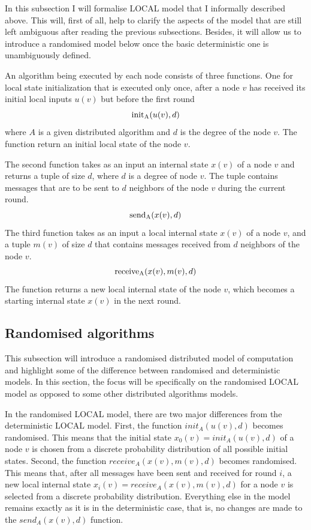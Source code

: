 In this subsection I will formalise LOCAL model that I informally described above.
This will, first of all, help to clarify the aspects of the model that are still left ambiguous
after reading the previous subsections. Besides, it will allow us to introduce
a randomised model below once the basic deterministic one is unambiguously defined.

An algorithm being executed by each node consists of 
three functions. One for local state initialization that is executed only once, after
a node $v$ has received its initial local inputs $u(v)$ but before the first round
$$\init_A(u(v), d)$$
where $A$ is a given distributed algorithm and $d$ is the degree of the node $v$.
The function return an initial local state of the node $v$.

The second function takes as an input an internal state $x(v)$ of a node $v$
and returns a tuple of size $d$, where $d$ is a degree of node $v$. The
tuple contains messages that are to be sent to $d$ neighbors of the node $v$
during the current round.
$$\send_A(x(v), d)$$
The third function takes as an input a local internal state $x(v)$ of a node
$v$, and a tuple $m(v)$ of size $d$ that contains messages received from $d$ neighbors
of the node $v$.
$$\receive_A(x(v), m(v), d)$$
The function returns a new local internal state of the node $v$, which becomes a
starting internal state $x(v)$ in the next round.

\subsection{Randomised algorithms}

This subsection will introduce a randomised distributed model of computation
and highlight some of the difference between randomised and deterministic
models. In this section, the focus will be specifically on the randomised LOCAL
model as opposed to some other distributed algorithms models.

In the randomised LOCAL model, there are two major differences from the
deterministic LOCAL model. First, the function $init_A(u(v), d)$ becomes
randomised. This means that the initial state $x_0(v) = init_A(u(v), d)$ of a node $v$ is
chosen from a discrete probability distribution of all possible initial states.
Second, the function $receive_A(x(v), m(v), d)$ becomes randomised. This means that,
after all messages have been sent and received for round $i$, a new local internal
state $x_i(v) = receive_A(x(v), m(v), d)$ for a node $v$ is selected from a
discrete probability distribution. Everything else in the model remains exactly
as it is in the deterministic case, that is, no changes are made to the $send_A(x(v), d)$
function.

